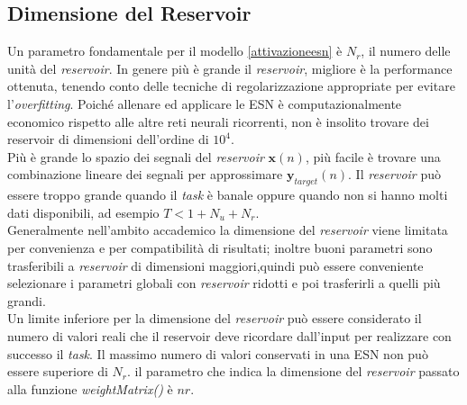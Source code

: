 \subsection{Dimensione del Reservoir}
Un parametro fondamentale per il modello \ref{attivazioneesn} è $N_r$, il numero delle unità del \textit{reservoir}. In genere più è grande il \textit{reservoir}, migliore è la performance ottenuta, tenendo conto delle tecniche di regolarizzazione appropriate per evitare l'\textit{overfitting}. Poiché allenare ed applicare le ESN è computazionalmente economico rispetto alle altre reti neurali ricorrenti, non è insolito trovare dei reservoir di dimensioni dell'ordine di $10^4$.\\
Più è grande lo spazio dei segnali del \textit{reservoir} $\mathbf{x}(n)$, più facile è trovare una combinazione lineare dei segnali per approssimare $\mathbf{y}_{target}(n)$. Il \textit{reservoir} può essere troppo grande quando il \textit{task} è banale oppure quando non si hanno molti dati disponibili, ad esempio $T< 1+ N_u +N_r$.\\
Generalmente nell'ambito accademico la dimensione del \textit{reservoir} viene limitata per convenienza e per compatibilità di risultati; inoltre buoni parametri sono trasferibili a \textit{reservoir} di dimensioni maggiori,quindi può essere conveniente selezionare i parametri globali con \textit{reservoir} ridotti e poi trasferirli a quelli più grandi.\\
Un limite inferiore per la dimensione del \textit{reservoir} può essere considerato il numero di valori reali che il reservoir deve ricordare dall'input per realizzare con successo il \textit{task}. Il massimo numero di valori conservati in una ESN non può essere superiore di $N_r$.
il parametro che indica la dimensione del \textit{reservoir}  passato alla funzione \textit{weightMatrix()} è $nr$.


